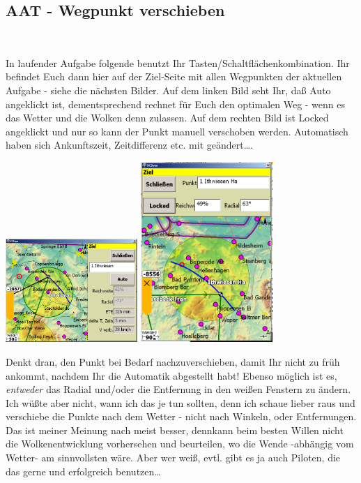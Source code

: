 \subsection{AAT - Wegpunkt verschieben}
\begin{center}
\blink~\blink~\blink~\bblitz
\end{center}
In laufender Aufgabe folgende benutzt Ihr Tasten/Schaltflächenkombination. Ihr befindet Euch dann hier auf der \textsf{Ziel}-Seite mit allen Wegpunkten der aktuellen Aufgabe - siehe die nächsten Bilder. Auf dem linken Bild seht Ihr, daß \textsf{Auto} angeklickt ist, dementsprechend rechnet \xc für Euch den optimalen Weg - wenn es das Wetter und die Wolken denn zulassen. Auf dem rechten Bild ist  \textsf{Locked} angeklickt und nur so kann der  Punkt manuell verschoben werden. Automatisch haben sich Ankunftszeit, Zeitdifferenz etc. mit geändert\dots.
\begin{center}
\includegraphics[width=5cm]{Bilder/AAT-Verschieb0.png}%
\qquad
\includegraphics[width=5cm]{Bilder/AAT-Verschieb1.png}%
\end{center}
Denkt dran, den Punkt bei Bedarf nachzuverschieben, damit Ihr nicht zu früh ankommt, nachdem Ihr die Automatik abgestellt habt! Ebenso möglich ist es, \textsl{entweder} das Radial und/oder die Entfernung in den weißen Fenstern zu ändern. Ich wüßte aber nicht, wann ich das je tun sollten, denn ich schaue lieber raus und verschiebe die Punkte nach dem Wetter - nicht nach Winkeln, oder Entfernungen.
Das ist meiner Meinung nach meist besser, denn\xc kann beim besten Willen nicht die Wolkenentwicklung vorhersehen und beurteilen, wo die Wende -abhängig vom Wetter- am sinnvollsten wäre. Aber wer weiß, evtl. gibt es ja auch Piloten, die das gerne und erfolgreich benutzen\dots
%
